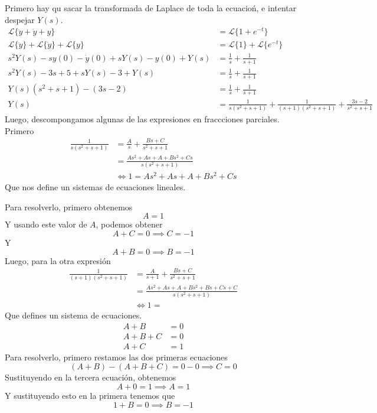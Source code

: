 \documentclass{article}
\begin{document}
\begin{enumerate}
{            Primero hay qu sacar la transformada de 
            Laplace de toda la ecuacioń, e intentar despejar $Y(s)$.
            \begin{align*}
                \mathcal{L}\{\ddot y + \dot y + y\} &= \mathcal{L}\{1 + e^{-t}\}\\
                \mathcal{L}\{\ddot y\} + \mathcal{L}\{\dot y\} + \mathcal{L}\{y\}
                &= \mathcal{L}\{1\} + \mathcal{L}\{e^{-t}\} \\
                s^2 Y(s) - s y(0) - \dot y(0) + sY(s) - y(0) + Y(s) &= \frac{1}{s}
                + \frac{1}{s+1} \\
                s^2 Y(s) - 3s + 5 + s Y(s) - 3 + Y(s) &= \frac{1}{s} + \frac{1}{s+1}\\
                Y(s) (s^2 + s + 1) - (3s-2) &= \frac{1}{s} + \frac{1}{s+1}\\
                Y(s) &= \frac{1}{s(s^2 + s + 1)} + \frac{1}{(s+1)(s^2 + s + 1)} 
                + \frac{3s-2}{s^2 + s + 1}
            \end{align*}
            Luego, descompongamos algunas de las expresiones en fraccciones
            parciales.
            Primero
            \begin{align*}
                \frac{1}{s(s^2+s+1)} &= \frac{A}{s} + \frac{Bs + C}{s^2+s+1} \\
                &= \frac{As^2+As+A+Bs^2+Cs}{s(s^2+s+1)} \\
                &\iff 1 = As^2+As+A+Bs^2+Cs
            \end{align*}
            Que nos define un sistemas de ecuaciones lineales.

            Para resolverlo, primero obtenemos
            \[A = 1\]
            Y usando este valor de $A$, podemos obtener
            \[A + C = 0 \implies C = -1\]
            Y
            \[A + B = 0 \implies B = -1\]
            Luego, para la otra expresión
            \begin{align*}
                \frac{1}{(s+1)(s^2 + s + 1)} &= \frac{A}{s+1} + \frac{Bs+C}{s^2+s+1} \\
                &= \frac{As^2+As+A+Bs^2+Bs+Cs+C}{s(s^2+s+1)} \\
                &\iff 1 = 
            \end{align*}
            Que defines un sistema de ecuaciones.
            \begin{align*}
                A + B &= 0 \\
                A + B + C &= 0 \\
                A + C &= 1
            \end{align*}
            Para resolverlo, primero restamos las dos primeras ecuaciones
            \[(A+B)-(A+B+C) = 0 - 0 \implies C = 0\]
            Sustituyendo en la tercera ecuación, obtenemos
            \[A + 0 = 1 \implies A = 1\]
            Y sustituyendo esto en la primera tenemos que
            \[1 + B = 0 \implies B = -1\]

}
\end{enumerate}
\end{document}
